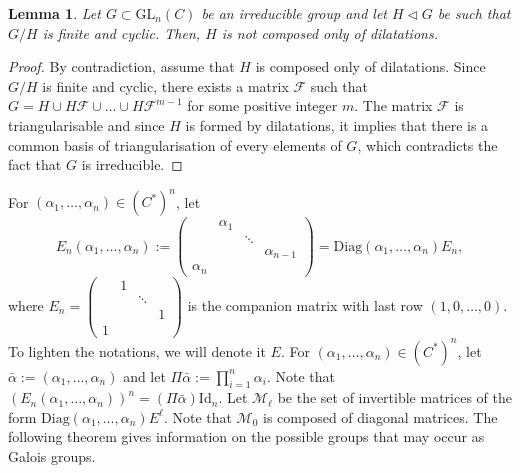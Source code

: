 \documentclass[a4paper,11pt]{amsart}
\newtheorem{lem}[thm]{Lemma}
\begin{document}
\begin{lem}
\label{lem:irred_primitive_G}
Let $G \subset \mathrm{GL}_n (C)$ be an irreducible group and let $H\triangleleft G$ be such that $G/H$ is finite and cyclic. Then, $H$ is not composed only of dilatations.
\end{lem}

\begin{proof}
By contradiction, assume that $H$ is composed only of dilatations. Since $G/H$ is finite and cyclic,  there exists a matrix $\mathscr{F}$ such that $G=H\cup H \mathscr{F} \cup\dots  \cup H \mathscr{F}^{m-1}$ for some positive integer $m$.  The matrix $\mathscr{F}$ is triangularisable and since $H$ is formed by dilatations,  it implies that there is a common basis of triangularisation of every elements of $G$, which contradicts the fact that $G$ is irreducible.
\end{proof}

 
For $(\alpha_{1},\dots, \alpha_n)\in (C^*)^n$, let $$E_n (\alpha_{1},\dots, \alpha_n):=\begin{pmatrix}
& \alpha_1&&\\ 
 &  &\ddots & \\
&&&\alpha_{n-1}\\
\alpha_n&&&
\end{pmatrix}=
\mathrm{Diag} (\alpha_{1},\dots, \alpha_n)E_n, $$
where
$E_n=\begin{pmatrix}
& 1&&\\ 
 &  &\ddots & \\
&&&1\\
1&&&
\end{pmatrix}$ is the companion matrix with last row  $(1,0,\dots,0)$. To lighten the notations, we will denote it $E$. For $(\alpha_{1},\dots, \alpha_n)\in (C^*)^n$, let $\bar{\alpha}:=(\alpha_{1},\dots, \alpha_n)$ and let $\Pi\bar{\alpha} :=\prod_{i=1}^{n}\alpha_{i}$.  Note that $\left(E_n (\alpha_{1},\dots, \alpha_n)\right)^n=(\Pi \bar{\alpha} )\mathrm{Id}_n$. Let $\mathcal{M}_\ell$ be the set of invertible matrices of the form $\mathrm{Diag} (\alpha_{1},\dots, \alpha_n)E^{\ell}$.  Note that $\mathcal{M}_0$ is composed of diagonal matrices. The following theorem gives information on the possible groups that may occur as Galois groups. 
\end{document}
